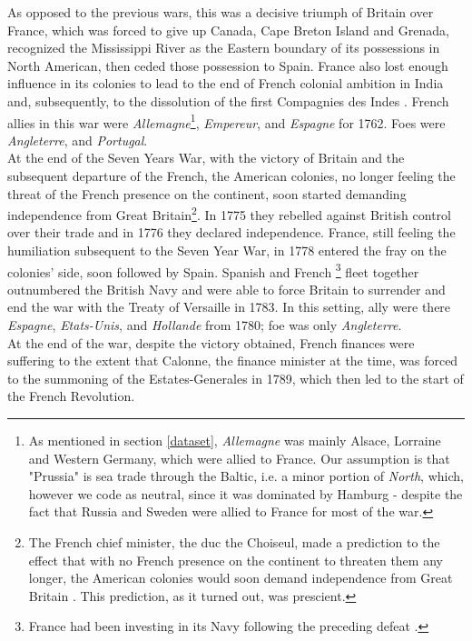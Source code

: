 \documentclass[12pt,a4paper,notitlepage,english]{article}
\begin{document}
\begin{appendix}
As opposed to the previous wars, this was a decisive triumph of Britain over France, which was forced to give up Canada, Cape Breton Island and Grenada, recognized the Mississippi River as the Eastern boundary of its possessions in North American, then ceded those possession to Spain.
France also lost enough influence in its colonies to lead to the end of French colonial ambition in India and, subsequently, to the dissolution of the first Compagnies des Indes \citep{Riley1986}.
French allies in this war were \textit{Allemagne}\footnote{As mentioned in section \ref{dataset}, \textit{Allemagne} was mainly Alsace, Lorraine and Western Germany, which were allied to France.
Our assumption is that "Prussia" is sea trade through the Baltic, i.e. a minor portion of \textit{North}, which, however we code as neutral, since it was dominated by Hamburg - despite the fact that Russia and Sweden were allied to France for most of the war.}, \textit{Empereur}, and \textit{Espagne} for 1762.
Foes were \textit{Angleterre}, and \textit{Portugal}. \\
At the end of the Seven Years War, with the victory of Britain and the subsequent departure of the French, the American colonies, no longer feeling the threat of the French presence on the continent, soon started demanding independence from Great Britain\footnote{The French chief minister, the duc the Choiseul, made a prediction to the effect that with no French presence on the continent to threaten them any longer, the American colonies would soon demand independence from Great Britain \citep{Findlay2009}.
This prediction, as it turned out, was prescient.}.
In 1775 they rebelled against British control over their trade and in 1776 they declared independence.
France, still feeling the humiliation subsequent to the Seven Year War, in 1778 entered the fray on the colonies' side, soon followed by Spain.
Spanish and French \footnote{France had been investing in its Navy following the preceding defeat \citep{Findlay2009}.} fleet together outnumbered the British Navy and were able to force Britain to surrender and end the war with the Treaty of Versaille in 1783.
In this setting, ally were there \textit{Espagne}, \textit{Etats-Unis}, and \textit{Hollande} from 1780; foe was only \textit{Angleterre}. \\
At the end of the war, despite the victory obtained, French finances were suffering to the extent that Calonne, the finance minister at the time, was forced to the summoning of the Estates-Generales in 1789, which then led to the start of the French Revolution.

\end{appendix}
\end{document}
